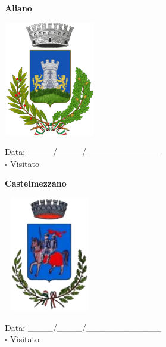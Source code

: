 \documentclass[a5paper,12pt]{article}
\begin{document}
\noindent
\begin{minipage}[t]{0.45\textwidth}
    \begin{center}
        \textbf{Aliano}
    \end{center}
    \vspace{-0.5cm} %
    \begin{center}
        \includegraphics[height= 5cm, width=4cm]{Basilicata/Aliano-Stemma.png}
    \end{center}
    \vspace{-0.4cm} %
    \begin{flushleft}
        Data: \_\_\_\_/\_\_\_\_/\_\_\_\_\_\_\_\_\_\_\_\_ \\
        $\square$ Visitato
    \end{flushleft}
\end{minipage}
\hfill
\noindent
\begin{minipage}[t]{0.45\textwidth}
    \begin{center}
        \textbf{Castelmezzano}
    \end{center}
    \vspace{-0.5cm} %
    \begin{center}
        \includegraphics[height= 5cm, width=4cm]{Basilicata/Castelmezzano-Stemma.png}
    \end{center}
    \vspace{-0.4cm} %
    \begin{flushleft}
        Data: \_\_\_\_/\_\_\_\_/\_\_\_\_\_\_\_\_\_\_\_\_ \\
        $\square$ Visitato
    \end{flushleft}
\end{minipage}
\end{document}
